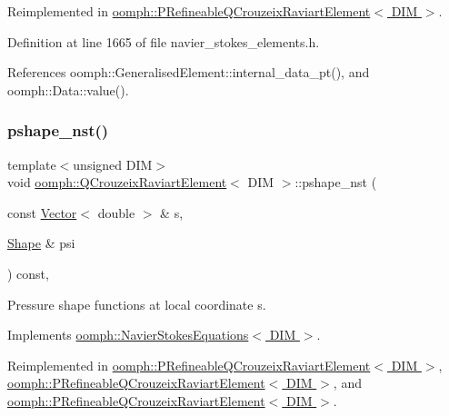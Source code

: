 Reimplemented in \hyperlink{classoomph_1_1PRefineableQCrouzeixRaviartElement_a1a70b2251c5150e4719db4e26bbde7f0}{oomph\+::\+P\+Refineable\+Q\+Crouzeix\+Raviart\+Element$<$ D\+I\+M $>$}.



Definition at line 1665 of file navier\+\_\+stokes\+\_\+elements.\+h.



References oomph\+::\+Generalised\+Element\+::internal\+\_\+data\+\_\+pt(), and oomph\+::\+Data\+::value().

\mbox{\label{classoomph_1_1QCrouzeixRaviartElement_a122c4b7ae47df08a07acd2f1ed6f61b0}} 
\subsubsection{\texorpdfstring{pshape\+\_\+nst()}{pshape\_nst()}\hspace{0.1cm}{\footnotesize\ttfamily [1/4]}}
{\footnotesize\ttfamily template$<$unsigned D\+IM$>$ \\
void \hyperlink{classoomph_1_1QCrouzeixRaviartElement}{oomph\+::\+Q\+Crouzeix\+Raviart\+Element}$<$ D\+IM $>$\+::pshape\+\_\+nst (\begin{DoxyParamCaption}\item[{const \hyperlink{classoomph_1_1Vector}{Vector}$<$ double $>$ \&}]{s,  }\item[{\hyperlink{classoomph_1_1Shape}{Shape} \&}]{psi }\end{DoxyParamCaption}) const\hspace{0.3cm}{\ttfamily [inline]}, {\ttfamily [virtual]}}



Pressure shape functions at local coordinate s. 



Implements \hyperlink{classoomph_1_1NavierStokesEquations_a487030303b71da299aed3d4639a022ab}{oomph\+::\+Navier\+Stokes\+Equations$<$ D\+I\+M $>$}.



Reimplemented in \hyperlink{classoomph_1_1PRefineableQCrouzeixRaviartElement_a556b7533944abd5eedce664d708b4eae}{oomph\+::\+P\+Refineable\+Q\+Crouzeix\+Raviart\+Element$<$ D\+I\+M $>$}, \hyperlink{classoomph_1_1PRefineableQCrouzeixRaviartElement_a87afeb50892736eace1e3d68d6c53172}{oomph\+::\+P\+Refineable\+Q\+Crouzeix\+Raviart\+Element$<$ D\+I\+M $>$}, and \hyperlink{classoomph_1_1PRefineableQCrouzeixRaviartElement_a19222e5c997c7ce4a30452d9aab12ad0}{oomph\+::\+P\+Refineable\+Q\+Crouzeix\+Raviart\+Element$<$ D\+I\+M $>$}.



